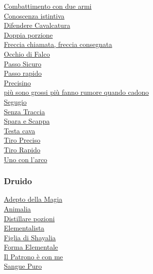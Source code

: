 \begin{multicols}{3}
{\begin{flushleft}
\hyperlink{Combattimento con due armi}{Combattimento con due armi}\\
\hyperlink{Conoscenza istintiva}{Conoscenza istintiva}\\
\hyperlink{Difendere Cavalcatura}{Difendere Cavalcatura}\\
\hyperlink{Doppia porzione}{Doppia porzione}\\
\hyperlink{Freccia chiamata, freccia consegnata}{Freccia chiamata, freccia consegnata}\\
\hyperlink{Occhio di Falco}{Occhio di Falco}\\
\hyperlink{Passo Sicuro}{Passo Sicuro}\\
\hyperlink{Passo rapido}{Passo rapido}\\
\hyperlink{Precisino}{Precisino}\\
\hyperlink{più sono grossi più fanno rumore quando cadono}{più sono grossi più fanno rumore quando cadono}\\
\hyperlink{Segugio}{Segugio}\\
\hyperlink{Senza Traccia}{Senza Traccia}\\
\hyperlink{Spara e Scappa}{Spara e Scappa}\\
\hyperlink{Testa cava}{Testa cava}\\
\hyperlink{Tiro Preciso}{Tiro Preciso}\\
\hyperlink{Tiro Rapido}{Tiro Rapido}\\
\hyperlink{Uno con l'arco}{Uno con l'arco}

\titlespacing*{\subsubsection}{0pt}{0.5em}{0.5em}\subsubsection*{Druido}

\hyperlink{Adepto della Magia}{Adepto della Magia}\\
\hyperlink{Animalia}{Animalia}\\
\hyperlink{Distillare pozioni}{Distillare pozioni}\\
\hyperlink{Elementalista}{Elementalista}\\
\hyperlink{Figlia di Shayalia}{Figlia di Shayalia}\\
\hyperlink{Forma Elementale}{Forma Elementale}\\
\hyperlink{Il Patrono è con me}{Il Patrono è con me}\\
\hyperlink{Sangue Puro}{Sangue Puro}


\end{flushleft}}
\end{multicols}
